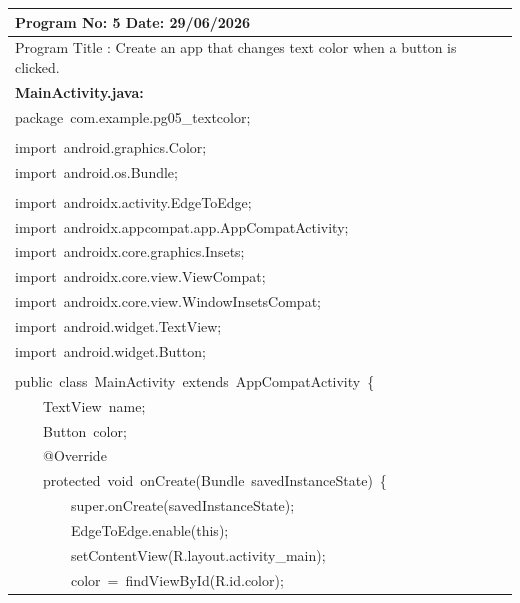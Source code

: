 \documentclass[a4paper,12pt]{article}
\begin{document}
\noindent\begingroup
\renewcommand{\arraystretch}{1.1}
\begin{longtable}{|p{}|}
\hline\endfirsthead\hline\endhead\hline\endfoot\hline\endlastfoot
\rule{0pt}{13pt}Program No: 5 \hfill Date: 29/06/2026 \\
\hline
\rule{0pt}{13pt}Program Title : Create an app that changes text color when a button is clicked. \\
\hline
\rule{0pt}{13pt}\textbf{MainActivity.java:} \\
\hline
{\ttfamily\small package\ com.example.pg05\_textcolor;} \\
\strut \\
{\ttfamily\small import\ android.graphics.Color;} \\
{\ttfamily\small import\ android.os.Bundle;} \\
\strut \\
{\ttfamily\small import\ androidx.activity.EdgeToEdge;} \\
{\ttfamily\small import\ androidx.appcompat.app.AppCompatActivity;} \\
{\ttfamily\small import\ androidx.core.graphics.Insets;} \\
{\ttfamily\small import\ androidx.core.view.ViewCompat;} \\
{\ttfamily\small import\ androidx.core.view.WindowInsetsCompat;} \\
{\ttfamily\small import\ android.widget.TextView;} \\
{\ttfamily\small import\ android.widget.Button;} \\
\strut \\
{\ttfamily\small public\ class\ MainActivity\ extends\ AppCompatActivity\ \{} \\
{\ttfamily\small \ \ \ \ TextView\ name;} \\
{\ttfamily\small \ \ \ \ Button\ color;} \\
{\ttfamily\small \ \ \ \ @Override} \\
{\ttfamily\small \ \ \ \ protected\ void\ onCreate(Bundle\ savedInstanceState)\ \{} \\
{\ttfamily\small \ \ \ \ \ \ \ \ super.onCreate(savedInstanceState);} \\
{\ttfamily\small \ \ \ \ \ \ \ \ EdgeToEdge.enable(this);} \\
{\ttfamily\small \ \ \ \ \ \ \ \ setContentView(R.layout.activity\_main);} \\
{\ttfamily\small \ \ \ \ \ \ \ \ color\ =\ findViewById(R.id.color);} \\

\end{longtable}
\end{document}
